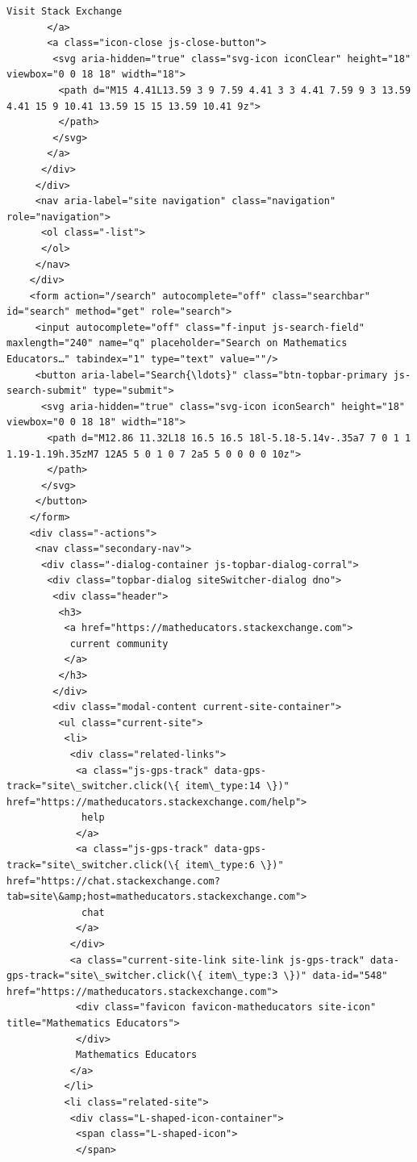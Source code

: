 \documentclass[11pt]{article}
\begin{document}
\begin{Verbatim}[commandchars=\\\{\}]
        Visit Stack Exchange
       </a>
       <a class="icon-close js-close-button">
        <svg aria-hidden="true" class="svg-icon iconClear" height="18" viewbox="0 0 18 18" width="18">
         <path d="M15 4.41L13.59 3 9 7.59 4.41 3 3 4.41 7.59 9 3 13.59 4.41 15 9 10.41 13.59 15 15 13.59 10.41 9z">
         </path>
        </svg>
       </a>
      </div>
     </div>
     <nav aria-label="site navigation" class="navigation" role="navigation">
      <ol class="-list">
      </ol>
     </nav>
    </div>
    <form action="/search" autocomplete="off" class="searchbar" id="search" method="get" role="search">
     <input autocomplete="off" class="f-input js-search-field" maxlength="240" name="q" placeholder="Search on Mathematics Educators…" tabindex="1" type="text" value=""/>
     <button aria-label="Search{\ldots}" class="btn-topbar-primary js-search-submit" type="submit">
      <svg aria-hidden="true" class="svg-icon iconSearch" height="18" viewbox="0 0 18 18" width="18">
       <path d="M12.86 11.32L18 16.5 16.5 18l-5.18-5.14v-.35a7 7 0 1 1 1.19-1.19h.35zM7 12A5 5 0 1 0 7 2a5 5 0 0 0 0 10z">
       </path>
      </svg>
     </button>
    </form>
    <div class="-actions">
     <nav class="secondary-nav">
      <div class="-dialog-container js-topbar-dialog-corral">
       <div class="topbar-dialog siteSwitcher-dialog dno">
        <div class="header">
         <h3>
          <a href="https://matheducators.stackexchange.com">
           current community
          </a>
         </h3>
        </div>
        <div class="modal-content current-site-container">
         <ul class="current-site">
          <li>
           <div class="related-links">
            <a class="js-gps-track" data-gps-track="site\_switcher.click(\{ item\_type:14 \})" href="https://matheducators.stackexchange.com/help">
             help
            </a>
            <a class="js-gps-track" data-gps-track="site\_switcher.click(\{ item\_type:6 \})" href="https://chat.stackexchange.com?tab=site\&amp;host=matheducators.stackexchange.com">
             chat
            </a>
           </div>
           <a class="current-site-link site-link js-gps-track" data-gps-track="site\_switcher.click(\{ item\_type:3 \})" data-id="548" href="https://matheducators.stackexchange.com">
            <div class="favicon favicon-matheducators site-icon" title="Mathematics Educators">
            </div>
            Mathematics Educators
           </a>
          </li>
          <li class="related-site">
           <div class="L-shaped-icon-container">
            <span class="L-shaped-icon">
            </span>

\end{Verbatim}
\end{document}
